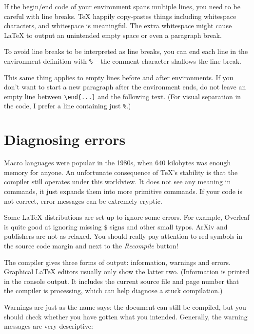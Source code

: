 \begin{gotcha}
If the begin/end code of your environment spans multiple lines,
you need to be careful with line breaks.
\TeX{} happily copy-pastes things including whitespace characters,
and whitespace is meaningful.
The extra whitespace might cause \LaTeX{} to output an unintended empty space
or even a paragraph break.

To avoid line breaks to be interpreted as line breaks,
you can end each line in the environment definition with \verb|%|
-- the comment character shallows the line break.

This same thing applies to empty lines before and after environments.
If you don't want to start a new paragraph after the environment ends,
do not leave an empty line between \verb|\end{...}| and the following text.
(For visual separation in the code, I prefer a line containing just \verb|%|.)
\end{gotcha}




%
%
%
\section{Diagnosing errors}

Macro languages were popular in the 1980s, when 640 kilobytes was enough memory for anyone.
An unfortunate consequence of \TeX's stability is that the compiler still operates under this worldview.
It does not see any meaning in commands, it just expands them into more primitive commands.
If your code is not correct, error messages can be extremely cryptic.

\begin{overleaf}
Some \LaTeX{} distributions are set up to ignore some errors.
For example, Overleaf is quite good at ignoring missing \verb|$| signs and other small typos.
ArXiv and publishers are not as relaxed.
You should really pay attention to red symbols in the source code margin
and next to the \emph{Recompile} button!
\end{overleaf}

The compiler gives three forms of output: information, warnings and errors.
Graphical \LaTeX{} editors usually only show the latter two.
(Information is printed in the console output.
It includes the current source file and page number that the compiler is processing,
which can help diagnose a stuck compilation.)

Warnings are just as the name says: the document can still be compiled,
but you should check whether you have gotten what you intended.
Generally, the warning messages are very descriptive:

